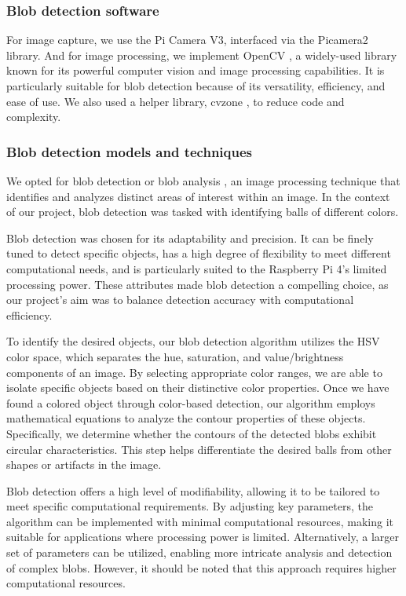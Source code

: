 \subsubsection{Blob detection software}

For image capture, we use the Pi Camera V3, interfaced via the Picamera2 library. And for image processing, we implement OpenCV \cite{OpenCVDoc}, a widely-used library known for its powerful computer vision and image processing capabilities. It is particularly suitable for blob detection because of its versatility, efficiency, and ease of use. We also used a helper library, cvzone \cite{CVzoneDoc}, to reduce code and complexity. 

\subsubsection{Blob detection models and techniques}

We opted for blob detection or blob analysis \cite{OpenCVBlob}, an image processing technique that identifies and analyzes distinct areas of interest within an image. In the context of our project, blob detection was tasked with identifying balls of different colors.

Blob detection was chosen for its adaptability and precision. It can be finely tuned to detect specific objects, has a high degree of flexibility to meet different computational needs, and is particularly suited to the Raspberry Pi 4's limited processing power. These attributes made blob detection a compelling choice, as our project's aim was to balance detection accuracy with computational efficiency.

To identify the desired objects, our blob detection algorithm utilizes the HSV color space\cite{HSV}, which separates the hue, saturation, and value/brightness components of an image. By selecting appropriate color ranges, we are able to isolate specific objects based on their distinctive color properties.\cite{OpenCVBlob} Once we have found a colored object through color-based detection, our algorithm employs mathematical equations to analyze the contour properties of these objects. Specifically, we determine whether the contours of the detected blobs exhibit circular characteristics. This step helps differentiate the desired balls from other shapes or artifacts in the image. \cite{OpenCVContours}

Blob detection offers a high level of modifiability, allowing it to be tailored to meet specific computational requirements. By adjusting key parameters, the algorithm can be implemented with minimal computational resources, making it suitable for applications where processing power is limited. Alternatively, a larger set of parameters can be utilized, enabling more intricate analysis and detection of complex blobs. However, it should be noted that this approach requires higher computational resources. 

